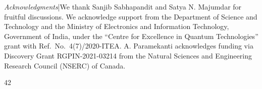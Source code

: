 \documentclass[aps,prl,twocolumn,superscriptaddress,showpacs,floatfix]{revtex4-2}
\begin{document}
\begin{acknowledgments}
\vspace{1em}
{\it Acknowledgments}|We thank Sanjib Sabhapandit and Satya N. Majumdar for fruitful discussions. We acknowledge support from the Department of Science and Technology and the Ministry of Electronics and Information Technology, Government of India, under the “Centre for Excellence in Quantum Technologies” grant with Ref.~No.~4(7)/2020-ITEA. A. Paramekanti acknowledges funding via Discovery Grant RGPIN-2021-03214 from the Natural Sciences and Engineering Research Council (NSERC) of Canada.
\end{acknowledgments}

\begin{thebibliography}{42}
\makeatletter
\providecommand \@ifxundefined [1]{
 \@ifx{#1\undefined}
}
\providecommand \@ifnum [1]{
 \ifnum #1\expandafter \@firstoftwo
 \else \expandafter \@secondoftwo
 \fi
}
\providecommand \@ifx [1]{
 \ifx #1\expandafter \@firstoftwo
 \else \expandafter \@secondoftwo
 \fi
}
\providecommand \natexlab [1]{#1}
\providecommand \enquote  [1]{``#1''}
\providecommand \bibnamefont  [1]{#1}
\providecommand \bibfnamefont [1]{#1}
\providecommand \citenamefont [1]{#1}
\providecommand \href@noop [0]{\@secondoftwo}
\providecommand \href [0]{\begingroup \@sanitize@url \@href}
\providecommand \@href[1]{\@@startlink{#1}\@@href}
\providecommand \@@href[1]{\endgroup#1\@@endlink}
\providecommand \@sanitize@url [0]{\catcode `\\12\catcode `\$12\catcode `\&12\catcode `\#12\catcode `\^12\catcode `\_12\catcode `\%12\relax}
\providecommand \@@startlink[1]{}
\providecommand \@@endlink[0]{}
\providecommand \url  [0]{\begingroup\@sanitize@url \@url }
\providecommand \@url [1]{\endgroup\@href {#1}{\urlprefix }}
\providecommand \urlprefix  [0]{URL }
\providecommand \Eprint [0]{\href }
\providecommand \doibase [0]{https://doi.org/}
\providecommand \selectlanguage [0]{\@gobble}
\providecommand \bibinfo  [0]{\@secondoftwo}
\providecommand \bibfield  [0]{\@secondoftwo}
\providecommand \translation [1]{[#1]}
\providecommand \BibitemOpen [0]{}
\providecommand \bibitemStop [0]{}
\providecommand \bibitemNoStop [0]{.\EOS\space}
\providecommand \EOS [0]{\spacefactor3000\relax}
\providecommand \BibitemShut  [1]{\csname bibitem#1\endcsname}
\let\auto@bib@innerbib\@empty


\end{thebibliography}
\end{document}
